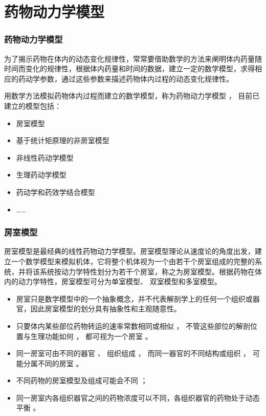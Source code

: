 \documentclass[dvipsnames, svgnames, x11names]{beamer}
\begin{document}
\section{药物动力学模型}


\begin{frame}
	\frametitle{药物动力学模型}
	为了揭示药物在体内的动态变化规律性，常常要借助数学的方法来阐明体内药量随时间而变化的规律性，根据体内药量和时间的数据，建立一定的数学模型，求得相应的药动学参数，通过这些参数来描述药物体内过程的动态变化规律性。
	
	用数学方法模拟药物体内过程而建立的数学模型，称为药物动力学模型 ， 目前已建立的模型包括：
	\begin{itemize}
	  \item 房室模型
	  \item 基于统计矩原理的非房室模型
	  \item 非线性药动学模型
	  \item 生理药动学模型
	  \item 药动学和药效学结合模型
	  \item ……
	\end{itemize}
\end{frame}


\begin{frame}
	\frametitle{房室模型}
	房室模型是最经典的线性药物动力学模型。房室模型理论从速度论的角度出发，建立一个数学模型来模拟机体，它将整个机体视为一个由若干个房室组成的完整的系统，并将该系统按动力学特性划分为若干个房室，称之为房室模型。根据药物在体内的动力学特性，房室模型可分为单室模型、 双室模型和多室模型。
	
	\begin{itemize}
	  \item 房室只是数学模型中的一个抽象概念，并不代表解剖学上的任何一个组织或器官，因此房室模型的划分具有抽象性和主观随意性。
	  \item 只要体内某些部位药物转运的速率常数相同或相似 ， 不管这些部位的解剖位置与生理功能如何 ， 都可视为一个房室 。
	  \item 同一房室可由不同的器官 、 组织组成 ， 而同一器官的不同结构或组织 ， 可能分属不同的房室 。
	  \item 不同药物的房室模型及组成可能会不同 ；
	  \item 同一房室内各组织器官之间的药物浓度可以不同，各组织器官的药物处于动态平衡 。
	\end{itemize}
	  
\end{frame}
\end{document}
